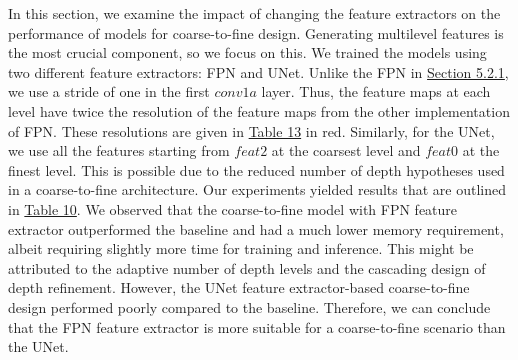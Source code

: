In this section, we examine the impact of changing the feature extractors on the performance of models for coarse-to-fine design. Generating multilevel features is the most crucial component, so we focus on this. We trained the models using two different feature extractors: FPN and UNet. Unlike the FPN in \hyperref[subsec:fe]{Section 5.2.1}, we use a stride of one in the first $conv1a$ layer. Thus, the feature maps at each level have twice the resolution of the feature maps from the other implementation of FPN. These resolutions are given in \hyperref[tab:arch-fpn]{Table 13} in red. Similarly, for the UNet, we use all the features starting from \(feat2\) at the coarsest level and \(feat0\) at the finest level. This is possible due to the reduced number of depth hypotheses used in a coarse-to-fine architecture. 
Our experiments yielded results that are outlined in \hyperref[tab:c2f]{Table 10}. We observed that the {\mvsn} coarse-to-fine model with FPN feature extractor outperformed the baseline and had a much lower memory requirement, albeit requiring slightly more time for training and inference. This might be attributed to the adaptive number of depth levels and the cascading design of depth refinement. However, the UNet feature extractor-based coarse-to-fine design performed poorly compared to the baseline. Therefore, we can conclude that the FPN feature extractor is more suitable for a coarse-to-fine scenario than the UNet.




